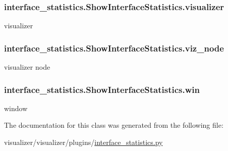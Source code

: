 \subsubsection[{\texorpdfstring{visualizer}{visualizer}}]{\setlength{\rightskip}{0pt plus 5cm}interface\+\_\+statistics.\+Show\+Interface\+Statistics.\+visualizer}\hypertarget{classinterface__statistics_1_1ShowInterfaceStatistics_a1547f0093ea7b91f54664f8ab6266b74}{}\label{classinterface__statistics_1_1ShowInterfaceStatistics_a1547f0093ea7b91f54664f8ab6266b74}


visualizer 

\subsubsection[{\texorpdfstring{viz\+\_\+node}{viz_node}}]{\setlength{\rightskip}{0pt plus 5cm}interface\+\_\+statistics.\+Show\+Interface\+Statistics.\+viz\+\_\+node}\hypertarget{classinterface__statistics_1_1ShowInterfaceStatistics_a3c1117b6913c299dae47950a3d7720a6}{}\label{classinterface__statistics_1_1ShowInterfaceStatistics_a3c1117b6913c299dae47950a3d7720a6}


visualizer node 

\subsubsection[{\texorpdfstring{win}{win}}]{\setlength{\rightskip}{0pt plus 5cm}interface\+\_\+statistics.\+Show\+Interface\+Statistics.\+win}\hypertarget{classinterface__statistics_1_1ShowInterfaceStatistics_a779a0f4e2eb460c53cff775b55b13815}{}\label{classinterface__statistics_1_1ShowInterfaceStatistics_a779a0f4e2eb460c53cff775b55b13815}


window 



The documentation for this class was generated from the following file\+:\begin{DoxyCompactItemize}
\item 
visualizer/visualizer/plugins/\hyperlink{interface__statistics_8py}{interface\+\_\+statistics.\+py}\end{DoxyCompactItemize}

